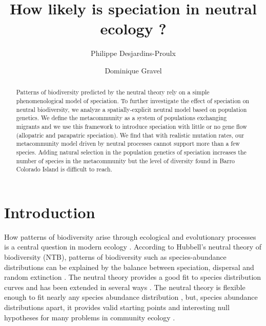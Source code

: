 \documentclass[letterpaper,twocolumn,superscriptaddress,showkeys]{revtex4}
\begin{document}
\title{How likely is speciation in neutral ecology ?}

\author{Philippe Desjardins-Proulx}

\author{Dominique Gravel}

\begin{abstract}
Patterns of biodiversity predicted by the neutral theory rely on a simple phenomenological model of speciation. To further investigate the effect of speciation on neutral biodiversity, we analyze a spatially-explicit neutral model based on population genetics. We define the metacommunity as a system of populations exchanging migrants and we use this framework to introduce speciation with little or no gene flow (allopatric and parapatric speciation). We find that with realistic mutation rates, our metacommunity model driven by neutral processes cannot support more than a few species. Adding natural selection in the population genetics of speciation increases the number of species in the metacommunity but the level of diversity found in Barro Colorado Island is difficult to reach.
\end{abstract}


\maketitle

\section{Introduction}

How patterns of biodiversity arise through ecological and evolutionary processes is a central question in modern ecology \cite{joh07,fus07}. According to Hubbell's neutral theory of biodiversity (NTB), patterns of biodiversity such as species-abundance distributions can be explained by the balance between speciation, dispersal and random extinction \cite{hub01,ros11b}. The neutral theory provides a good fit to species distribution curves \cite{hub01} and has been extended in several ways \cite{hae09,vol05,dea09,ros10}. The neutral theory is flexible enough to fit nearly any species abundance distribution \cite{cha02}, but, species abundance distributions apart, it provides valid starting points and interesting null hypotheses for many problems in community ecology \cite{alo06,lei07}.
\end{document}
